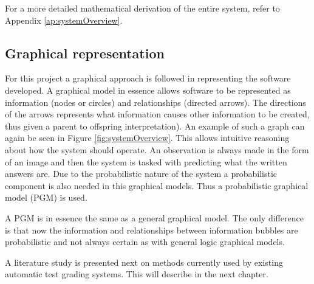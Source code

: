For a more detailed mathematical derivation of the entire system, refer to Appendix \ref{ap:systemOverview}.

\subsection{Graphical representation}

For this project a graphical approach is followed in representing the software developed. A graphical model in essence allows software to be represented as information (nodes or circles) and relationships (directed arrows). The directions of the arrows represents what information causes other information to be created, thus given a parent to offspring interpretation). An example of such a graph can again be seen in Figure \ref{fig:systemOverview}. This allows intuitive reasoning about how the system should operate. An observation is always made in the form of an image and then the system is tasked with predicting what the written answers are. Due to the probabilistic nature of the system a probabilistic component is also needed in this graphical models. Thus a probabilistic graphical model (PGM) is used.

A PGM is in essence the same as a general graphical model. The only difference is that now the information and relationships between information bubbles are probabilistic and not always certain as with general logic graphical models.

A literature study is presented next on methods currently used by existing automatic test grading systems. This will describe in the next chapter.